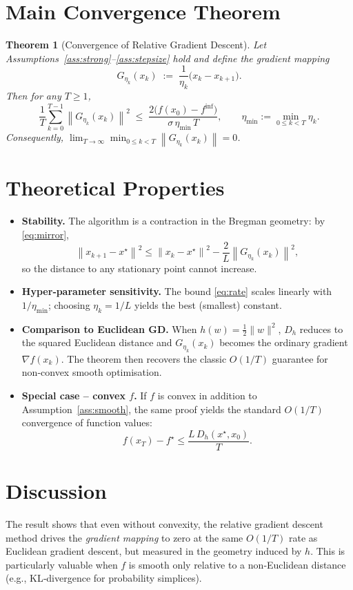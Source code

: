 \documentclass{article}
\newtheorem{theorem}{Theorem}
\newcommand{\norm}[1]{\left\lVert#1\right\rVert}
\begin{document}
\section*{Main Convergence Theorem}
\begin{theorem}[Convergence of Relative Gradient Descent]
\label{thm:main}
Let Assumptions~\ref{ass:strong}--\ref{ass:stepsize} hold and define the \emph{gradient mapping}
\[
G_{\eta_{k}}(x_{k})\;:=\;\frac{1}{\eta_{k}}\bigl(x_{k}-x_{k+1}\bigr).
\]
Then for any $T\ge 1$,
\begin{equation}
\label{eq:rate}
\frac{1}{T}\sum_{k=0}^{T-1}\norm{G_{\eta_{k}}(x_{k})}^{2}
\;\le\;
\frac{2\bigl(f(x_{0})-f^{\inf}\bigr)}{\sigma\,\eta_{\min}\,T},
\qquad
\eta_{\min}:=\min_{0\le k<T}\eta_{k}.
\end{equation}
Consequently, $\displaystyle \lim_{T\to\infty}\min_{0\le k<T}\norm{G_{\eta_{k}}(x_{k})}=0$.
\end{theorem}

\section*{Theoretical Properties}
\begin{itemize}
\item \textbf{Stability.} The algorithm is a contraction in the Bregman geometry: by \eqref{eq:mirror},
\[
\norm{x_{k+1}-x^{\star}}^{2}\le \norm{x_{k}-x^{\star}}^{2}-\frac{2}{L}\norm{G_{\eta_{k}}(x_{k})}^{2},
\]
so the distance to any stationary point cannot increase.
\item \textbf{Hyper‑parameter sensitivity.} The bound \eqref{eq:rate} scales linearly with $1/\eta_{\min}$; choosing $\eta_{k}=1/L$ yields the best (smallest) constant.
\item \textbf{Comparison to Euclidean GD.} When $h(w)=\frac12\|w\|^{2}$, $D_{h}$ reduces to the squared Euclidean distance and $G_{\eta_{k}}(x_{k})$ becomes the ordinary gradient $\nabla f(x_{k})$. The theorem then recovers the classic $O(1/T)$ guarantee for non‑convex smooth optimisation.
\item \textbf{Special case – convex $f$.} If $f$ is convex in addition to Assumption~\ref{ass:smooth}, the same proof yields the standard $O(1/T)$ convergence of function values:
\[
f(x_{T})-f^{\star}\le \frac{L\,D_{h}(x^{\star},x_{0})}{T}.
\]
\end{itemize}

\section*{Discussion}
The result shows that even without convexity, the relative gradient descent method drives the \emph{gradient mapping} to zero at the same $O(1/T)$ rate as Euclidean gradient descent, but measured in the geometry induced by $h$. This is particularly valuable when $f$ is smooth only relative to a non‑Euclidean distance (e.g., KL‑divergence for probability simplices).
\end{document}
